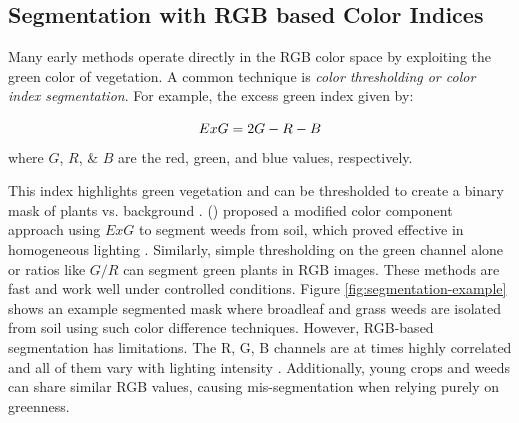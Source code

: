 \documentclass[letterpaper, notitlepage]{report}
\begin{document}
\subsection{Segmentation with RGB based Color Indices}  
Many early methods operate directly in the RGB color space by exploiting the green color of vegetation. A common technique is \textit{color thresholding or color index segmentation}. For example, the excess green index given by:

\begin{equation}\label{eqn:exg}
ExG = 2G - R - B \\
\end{equation}
 where $G$, $R$, \& $B$ are the red, green, and blue values, respectively.
 
 This index highlights green vegetation and can be thresholded to create a binary mask of plants vs. background \parencite{Wu2021-gt}. \citeauthor{Tang2000-an} (\citeyear{Tang2000-an}) proposed a modified color component approach using $ExG$ to segment weeds from soil, which proved effective in homogeneous lighting \parencite{Tang2000-an}. Similarly, simple thresholding on the green channel alone or ratios like $G/R$ can segment green plants in RGB images. These methods are fast and work well under controlled conditions. Figure \ref{fig:segmentation-example} shows an example segmented mask where broadleaf and grass weeds are isolated from soil using such color difference techniques. However, RGB-based segmentation has limitations. The R, G, B channels are at times highly correlated and all of them vary with lighting intensity \parencite{Wu2021-gt}. Additionally, young crops and weeds can share similar RGB values, causing mis-segmentation when relying purely on greenness.
\end{document}

